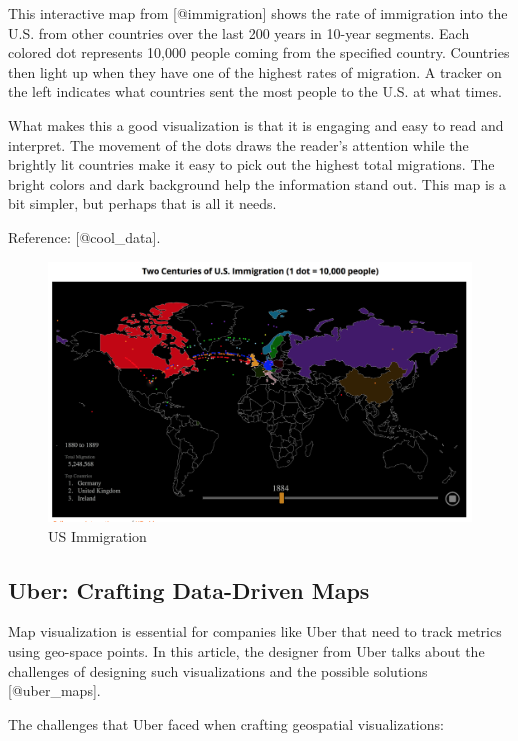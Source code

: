 \documentclass[]{book}
\theoremstyle{definition}
\theoremstyle{definition}
\theoremstyle{definition}
\theoremstyle{remark}
\begin{document}
This interactive map from {[}@immigration{]} shows the rate of
immigration into the U.S. from other countries over the last 200 years
in 10-year segments. Each colored dot represents 10,000 people coming
from the specified country. Countries then light up when they have one
of the highest rates of migration. A tracker on the left indicates what
countries sent the most people to the U.S. at what times.

What makes this a good visualization is that it is engaging and easy to
read and interpret. The movement of the dots draws the reader's
attention while the brightly lit countries make it easy to pick out the
highest total migrations. The bright colors and dark background help the
information stand out. This map is a bit simpler, but perhaps that is
all it needs.

Reference: {[}@cool\_data{]}.

\begin{figure}
\centering
\includegraphics{images/immigration.png}
\caption{US Immigration}
\end{figure}

\subsection{Uber: Crafting Data-Driven
Maps}\label{uber-crafting-data-driven-maps}

Map visualization is essential for companies like Uber that need to
track metrics using geo-space points. In this article, the designer from
Uber talks about the challenges of designing such visualizations and the
possible solutions {[}@uber\_maps{]}.

The challenges that Uber faced when crafting geospatial visualizations:
\end{document}
